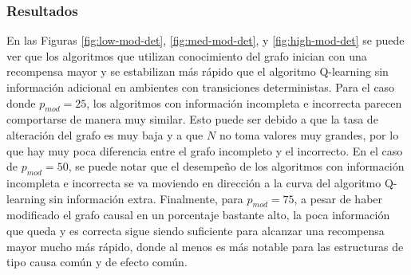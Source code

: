 \subsubsection{Resultados}

En las Figuras \ref{fig:low-mod-det}, \ref{fig:med-mod-det}, y \ref{fig:high-mod-det} se puede ver que los algoritmos que utilizan conocimiento del grafo inician con una recompensa mayor y se estabilizan más rápido que el algoritmo Q-learning
sin información adicional en ambientes con transiciones deterministas. Para el caso donde $p_{mod} = 25$, los algoritmos con información incompleta e incorrecta parecen 
comportarse de manera muy similar. Esto puede ser debido 
a que la tasa de alteración del grafo es muy baja y  a que $N$ no toma
valores muy grandes, por lo que hay muy poca diferencia entre el grafo incompleto y el incorrecto. 
En el caso de $p_{mod} = 50$, se
puede notar que el desempeño de los algoritmos
con información incompleta e incorrecta se 
va moviendo en dirección a la curva del algoritmo
Q-learning sin información extra.
Finalmente, para $p_{mod} = 75$,  a pesar de haber modificado el grafo 
causal en un porcentaje bastante alto, la poca información que queda y es correcta sigue siendo suficiente para alcanzar una recompensa mayor mucho más rápido, donde al menos es más notable para las estructuras de tipo causa común y de efecto común.


